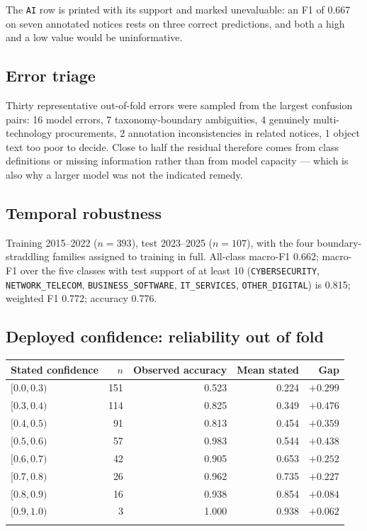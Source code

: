The \texttt{AI} row is printed with its support and marked unevaluable: an F1 of 0.667 on seven annotated
notices rests on three correct predictions, and both a high and a low value would be uninformative.

\subsection*{Error triage}

Thirty representative out-of-fold errors were sampled from the largest confusion pairs: 16 model errors,
7 taxonomy-boundary ambiguities, 4 genuinely multi-technology procurements, 2 annotation inconsistencies in
related notices, 1 object text too poor to decide. Close to half the residual therefore comes from class
definitions or missing information rather than from model capacity --- which is also why a larger model was
not the indicated remedy.

\subsection*{Temporal robustness}

Training 2015--2022 ($n = 393$), test 2023--2025 ($n = 107$), with the four boundary-straddling families
assigned to training in full. All-class macro-F1 0.662; macro-F1 over the five classes with test support of
at least 10 (\texttt{CYBERSECURITY}, \texttt{NETWORK\_TELECOM}, \texttt{BUSINESS\_SOFTWARE},
\texttt{IT\_SERVICES}, \texttt{OTHER\_DIGITAL}) is 0.815; weighted F1 0.772; accuracy 0.776.

\subsection*{Deployed confidence: reliability out of fold}

\begin{longtable}[]{@{}lrrrr@{}}
\toprule\noalign{}
Stated confidence & $n$ & Observed accuracy & Mean stated & Gap \\
\midrule\noalign{}
\endhead
$[0.0,0.3)$ & 151 & 0.523 & 0.224 & $+0.299$ \\
$[0.3,0.4)$ & 114 & 0.825 & 0.349 & $+0.476$ \\
$[0.4,0.5)$ & 91 & 0.813 & 0.454 & $+0.359$ \\
$[0.5,0.6)$ & 57 & 0.983 & 0.544 & $+0.438$ \\
$[0.6,0.7)$ & 42 & 0.905 & 0.653 & $+0.252$ \\
$[0.7,0.8)$ & 26 & 0.962 & 0.735 & $+0.227$ \\
$[0.8,0.9)$ & 16 & 0.938 & 0.854 & $+0.084$ \\
$[0.9,1.0)$ & 3 & 1.000 & 0.938 & $+0.062$ \\
\bottomrule\noalign{}
\end{longtable}

